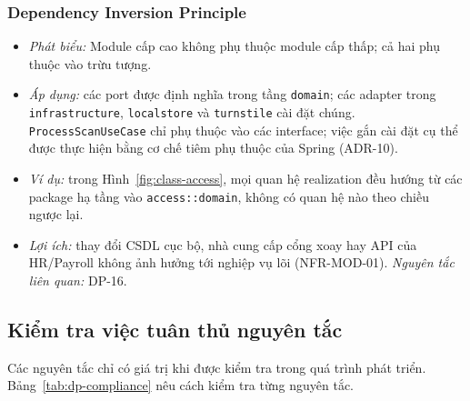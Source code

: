 \subsubsection{Dependency Inversion Principle}\label{sec:solid-dip}
\begin{itemize}
    \item \textit{Phát biểu:} Module cấp cao không phụ thuộc module cấp thấp; cả hai phụ thuộc vào trừu tượng.
    \item \textit{Áp dụng:} các port được định nghĩa trong tầng \texttt{domain}; các adapter trong \texttt{infrastructure}, \texttt{localstore} và \texttt{turnstile} cài đặt chúng. \texttt{ProcessScanUseCase} chỉ phụ thuộc vào các interface; việc gắn cài đặt cụ thể được thực hiện bằng cơ chế tiêm phụ thuộc của Spring (ADR-10).
    \item \textit{Ví dụ:} trong Hình~\ref{fig:class-access}, mọi quan hệ realization đều hướng từ các package hạ tầng vào \texttt{access::domain}, không có quan hệ nào theo chiều ngược lại.
    \item \textit{Lợi ích:} thay đổi CSDL cục bộ, nhà cung cấp cổng xoay hay API của HR/Payroll không ảnh hưởng tới nghiệp vụ lõi (NFR-MOD-01). \textit{Nguyên tắc liên quan:} DP-16.
\end{itemize}

\subsection{Kiểm tra việc tuân thủ nguyên tắc}\label{sec:dp-compliance}
Các nguyên tắc chỉ có giá trị khi được kiểm tra trong quá trình phát triển. Bảng~\ref{tab:dp-compliance} nêu cách kiểm tra từng nguyên tắc.

